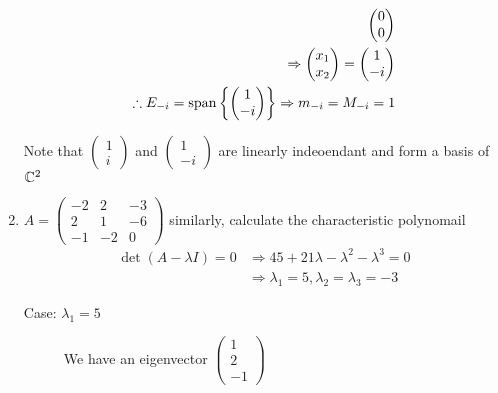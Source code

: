 \documentclass{article}
\numberwithin{equation}{section}
\begin{document}
\begin{eg}
\begin{enumerate}
\begin{align*}
\begin{pmatrix}
                0 \\ 0
            \end{pmatrix} \\
            \Rightarrow \begin{pmatrix}
                x_1 \\ x_2
            \end{pmatrix}
            = \begin{pmatrix}
                1 \\ -i
            \end{pmatrix} \\
            \therefore E_{-i} = \operatorname{span} \left\{ \begin{pmatrix}
                1 \\ -i
            \end{pmatrix} \right\} \Rightarrow m_{-i} = M_{-i} = 1
        \end{align*}

        Note that $\begin{pmatrix}
            1 \\ i
        \end{pmatrix}$ and $\begin{pmatrix}
            1 \\ -i
        \end{pmatrix}$ are linearly indeoendant and form a basis of $\mathbb{C}^2$

        \item $A = \begin{pmatrix}
            -2 & 2 & -3 \\
            2 & 1 & -6 \\
            -1 & -2 & 0
        \end{pmatrix}$ similarly, calculate the characteristic polynomail
        \begin{align*}
            \det(A - \lambda I) = 0 &\Rightarrow 45 + 21\lambda - \lambda^2 - \lambda^3 = 0 \\
            &\Rightarrow \lambda_1 = 5, \lambda_2 = \lambda_3 = -3
        \end{align*}

        \begin{description}
            \item[Case: $\lambda_1 = 5$] We have an eigenvector $\begin{pmatrix}
                1 \\ 2 \\ -1
            \end{pmatrix}$ 


\end{description}
\end{enumerate}
\end{eg}
\end{document}
